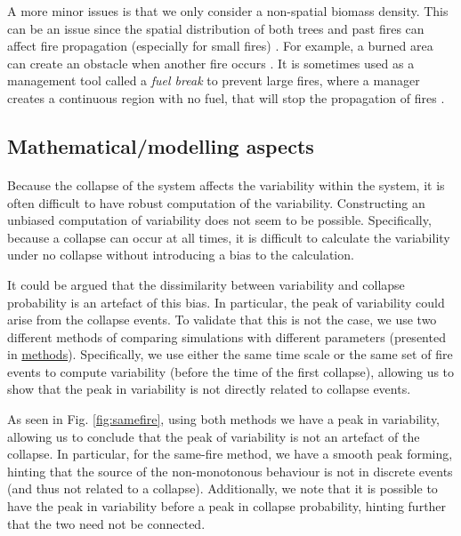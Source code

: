 \documentclass{article}
\begin{document}
A more minor issues is that we only consider a non-spatial biomass density. This can be an issue since the spatial distribution of both trees and past fires can affect fire propagation (especially for small fires) \citep{beaty_spatial_2002}. For example, a burned area can create an obstacle when another fire occurs \citep{bergeron_natural_2002, ager_modeling_2007}. It is sometimes used as a management tool called a \textit{fuel break} to prevent large fires, where a manager creates a continuous region with no fuel, that will stop the propagation of fires \citep{syphard_comparing_2011, agee_use_2000}.



\subsection{Mathematical/modelling aspects}

\paragraph{}
Because the collapse of the system affects the variability within the system, it is often difficult to have robust computation of the variability. Constructing an unbiased computation of variability does not seem to be possible. Specifically, because a collapse can occur at all times, it is difficult to calculate the variability under no collapse without introducing a bias to the calculation.

It could be argued that the dissimilarity between variability and collapse probability is an artefact of this bias. In particular, the peak of variability could arise from the collapse events. To validate that this is not the case, we use two different methods of comparing simulations with different parameters (presented in \hyperref[same_fire]{methods}). Specifically, we use either the same time scale or the same set of fire events to compute variability (before the time of the first collapse), allowing us to show that the peak in variability is not directly related to collapse events. 

As seen in Fig. \ref{fig:samefire}, using both methods we have a peak in variability, allowing us to conclude that the peak of variability is not an artefact of the collapse. In particular, for the same-fire method, we have a smooth peak forming, hinting that the source of the non-monotonous behaviour is not in discrete events (and thus not related to a collapse). Additionally, we note that it is possible to have the peak in variability before a peak in collapse probability, hinting further that the two need not be connected.
\end{document}
